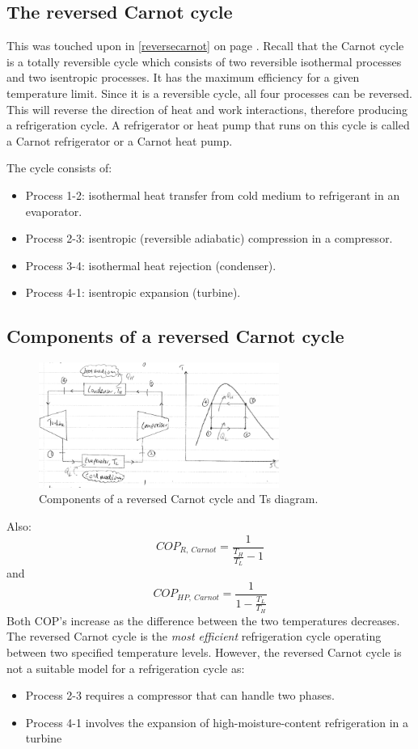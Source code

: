 \documentclass[class=report, crop=false, 12pt,a4paper]{standalone}
\begin{document}
\subsection{The reversed Carnot cycle}
This was touched upon in \ref{reversecarnot} on page \pageref{reversecarnot}. Recall that the Carnot cycle is a totally reversible cycle which consists of two reversible isothermal processes and two isentropic processes. It has the maximum efficiency for a given temperature limit. Since it is a reversible cycle, all four processes can be reversed. This will reverse the direction of heat and work interactions, therefore producing a refrigeration cycle. A refrigerator or heat pump that runs on this cycle is called a Carnot refrigerator or a Carnot heat pump.

The cycle consists of: 
\begin{itemize}[noitemsep]
  \item Process 1-2: isothermal heat transfer from cold medium to refrigerant in an evaporator.
  \item Process 2-3: isentropic (reversible adiabatic) compression in a compressor. 
  \item Process 3-4: isothermal heat rejection (condenser).
  \item Process 4-1: isentropic expansion (turbine).
\end{itemize}
\subsection{Components of a reversed Carnot cycle}
\begin{figure}
  \centering
  \includegraphics[width = 0.7\textwidth]{../img/ComponentsReversedCarnot}
  \caption{Components of a reversed Carnot cycle and Ts diagram.}
\end{figure}
Also:
\begin{equation}
  COP_{R, \ Carnot} = \frac{1}{\frac{T_H}{T_L} -1}
\end{equation}
and
\begin{equation}
  COP_{HP, \ Carnot} = \frac{1}{1 - \frac{T_L}{T_H}}
\end{equation}
Both COP's increase as the difference between the two temperatures decreases. The reversed Carnot cycle is the \emph{most efficient} refrigeration cycle operating between two specified temperature levels. However, the reversed Carnot cycle is not a suitable model for a refrigeration cycle as:
\begin{itemize}[noitemsep]
  \item Process 2-3 requires a compressor that can handle two phases.
  \item Process 4-1 involves the expansion of high-moisture-content refrigeration in a turbine
\end{itemize}
\end{document}
